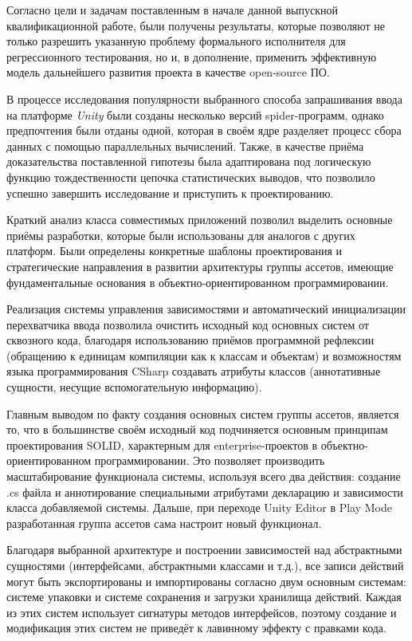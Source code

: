 \Conclusion
Согласно цели и задачам поставленным в начале данной выпускной квалификационной работе, были получены результаты, которые позволяют не только разрешить указанную проблему формального исполнителя для регрессионного тестирования, но и, в дополнение, применить эффективную \cite{open_source} модель дальнейшего развития проекта в качестве open-source ПО.

В процессе исследования популярности выбранного способа запрашивания ввода на платформе \textit{Unity} были созданы несколько версий spider-программ, однако предпочтения были отданы одной, которая в своём ядре разделяет процесс сбора данных с помощью параллельных вычислений. Также, в качестве приёма доказательства поставленной гипотезы была адаптирована под логическую функцию тождественности цепочка статистических выводов, что позволило успешно завершить исследование и приступить к проектированию.

Краткий анализ класса совместимых приложений позволил выделить основные приёмы разработки, которые были использованы для аналогов с других платформ. Были определены конкретные шаблоны проектирования и стратегические направления в развитии архитектуры группы ассетов, имеющие фундаментальные основания в объектно-ориентированном программировании.

Реализация системы управления зависимостями и автоматический инициализации перехватчика ввода позволила очистить исходный код основных систем от сквозного кода, благодаря использованию приёмов программной рефлексии (обращению к единицам компиляции как к классам и объектам) и возможностям языка программирования CSharp создавать атрибуты классов (аннотативные сущности, несущие вспомогательную информацию).

Главным выводом по факту создания основных систем группы ассетов, является то, что в большинстве своём исходный код подчиняется основным принципам проектирования SOLID, характерным для enterprise-проектов в объектно-ориентированном программировании. Это позволяет производить масштабирование функционала системы, используя всего два действия: создание .cs файла и аннотирование специальными атрибутами декларацию и зависимости класса добавляемой системы. Дальше, при переходе Unity Editor в Play Mode разработанная группа ассетов сама настроит новый функционал.

Благодаря выбранной архитектуре и построении зависимостей над абстрактными сущностями (интерфейсами, абстрактными классами и т.д.), все записи действий могут быть экспортированы и импортированы согласно двум основным системам: системе упаковки и системе сохранения и загрузки хранилища действий. Каждая из этих систем использует сигнатуры методов интерфейсов, поэтому создание и модификация этих систем не приведёт к лавинному эффекту с правками кода.

